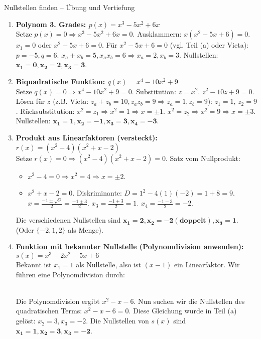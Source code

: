 \begin{loesungsumgebung}{Nullstellen finden – Übung und Vertiefung}
\begin{enumerate}[label=(\alph*)]
    \item \textbf{Polynom 3. Grades: $p(x) = x^3 - 5x^2 + 6x$} \\
    Setze $p(x)=0 \Rightarrow x^3 - 5x^2 + 6x = 0$. Ausklammern:
    $x(x^2 - 5x + 6) = 0$.
    $x_1 = 0$ oder $x^2 - 5x + 6 = 0$.
    Für $x^2 - 5x + 6 = 0$ (vgl. Teil (a) oder Vieta): $p=-5, q=6$. $x_a+x_b=5, x_a x_b=6 \Rightarrow x_a=2, x_b=3$.
    Nullstellen: $\mathbf{x_1=0, x_2=2, x_3=3}$.

    \item \textbf{Biquadratische Funktion: $q(x) = x^4 - 10x^2 + 9$} \\
    Setze $q(x)=0 \Rightarrow x^4 - 10x^2 + 9 = 0$. Substitution: $z = x^2$.
    $z^2 - 10z + 9 = 0$.
    Lösen für $z$ (z.B. Vieta: $z_a+z_b=10, z_a z_b=9 \Rightarrow z_a=1, z_b=9$):
    $z_1 = 1$, $z_2 = 9$.
    Rücksubstitution:
    $x^2 = z_1 \Rightarrow x^2 = 1 \Rightarrow x = \pm 1$.
    $x^2 = z_2 \Rightarrow x^2 = 9 \Rightarrow x = \pm 3$.
    Nullstellen: $\mathbf{x_1=1, x_2=-1, x_3=3, x_4=-3}$.

    \item \textbf{Produkt aus Linearfaktoren (versteckt): $r(x) = (x^2-4)(x^2+x-2)$} \\
    Setze $r(x)=0 \Rightarrow (x^2-4)(x^2+x-2) = 0$. Satz vom Nullprodukt:
    \begin{itemize}
        \item $x^2-4 = 0 \Rightarrow x^2 = 4 \Rightarrow x = \pm 2$.
        \item $x^2+x-2 = 0$. Diskriminante: $D = 1^2 - 4(1)(-2) = 1+8=9$.
        $x = \frac{-1 \pm \sqrt{9}}{2} = \frac{-1 \pm 3}{2}$.
        $x_3 = \frac{-1+3}{2} = 1$. $x_4 = \frac{-1-3}{2} = -2$.
    \end{itemize}
    Die verschiedenen Nullstellen sind $\mathbf{x_1=2, x_2=-2 (\text{doppelt}), x_3=1}$. (Oder $\{-2, 1, 2\}$ als Menge).

    \item \textbf{Funktion mit bekannter Nullstelle (Polynomdivision anwenden): $s(x) = x^3 - 2x^2 - 5x + 6$} \\
    Bekannt ist $x_1=1$ als Nullstelle, also ist $(x-1)$ ein Linearfaktor. Wir führen eine Polynomdivision durch:

    \\
    Die Polynomdivision ergibt $x^2 - x - 6$.
    Nun suchen wir die Nullstellen des quadratischen Terms: $x^2 - x - 6 = 0$.
    Diese Gleichung wurde in Teil (a) gelöst: $x_2=3, x_3=-2$.
    Die Nullstellen von $s(x)$ sind $\mathbf{x_1=1, x_2=3, x_3=-2}$.


\end{enumerate}
\end{loesungsumgebung}
